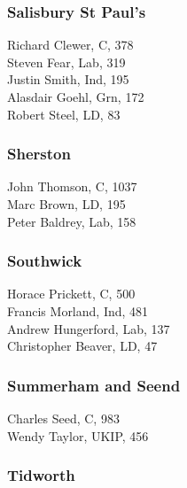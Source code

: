 \documentclass[a4paper,openany,10pt]{book}
\begin{document}
\subsubsection*{Salisbury St Paul's}



Richard Clewer, C, 378\\
Steven Fear, Lab, 319\\
Justin Smith, Ind, 195\\
Alasdair Goehl, Grn, 172\\
Robert Steel, LD, 83\\


\subsubsection*{Sherston}



John Thomson, C, 1037\\
Marc Brown, LD, 195\\
Peter Baldrey, Lab, 158\\


\subsubsection*{Southwick}



Horace Prickett, C, 500\\
Francis Morland, Ind, 481\\
Andrew Hungerford, Lab, 137\\
Christopher Beaver, LD, 47\\


\subsubsection*{Summerham and Seend}



Charles Seed, C, 983\\
Wendy Taylor, UKIP, 456\\


\subsubsection*{Tidworth}
\end{document}
